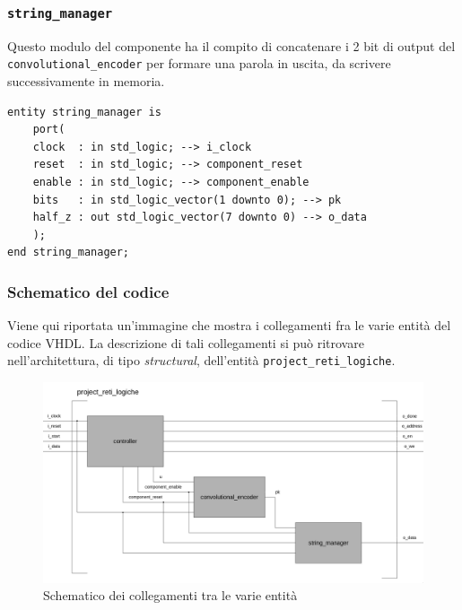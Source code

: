 \documentclass[11pt,a4paper]{article}
\begin{document}
            \subsubsection{\texttt{string\_manager}}
                Questo modulo del componente ha il compito di concatenare i 2 bit di output del \texttt{convolutional\_encoder} per formare una parola in uscita, da scrivere successivamente in memoria.
                \begin{verbatim}
entity string_manager is
    port(
    clock  : in std_logic; --> i_clock
    reset  : in std_logic; --> component_reset
    enable : in std_logic; --> component_enable
    bits   : in std_logic_vector(1 downto 0); --> pk
    half_z : out std_logic_vector(7 downto 0) --> o_data
    );
end string_manager;
                \end{verbatim}
            \subsubsection{Schematico del codice}
                Viene qui riportata un'immagine che mostra i collegamenti fra le varie entità del codice VHDL. La descrizione di tali collegamenti si può ritrovare nell'architettura, di tipo \textit{structural}, dell'entità \texttt{project\_reti\_logiche}.
                \begin{figure}[h]
                    \centering
                    \includegraphics[width = \linewidth]{progetto_reti_logiche.png}
                    \caption{Schematico dei collegamenti tra le varie entità}
                    \label{collegamento_entità}
                \end{figure}
\end{document}
